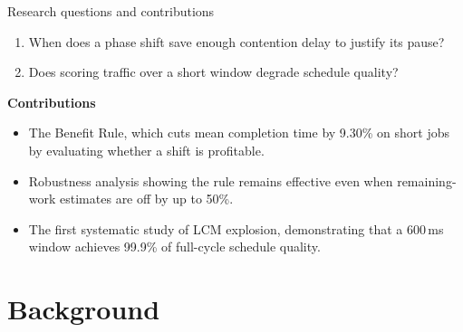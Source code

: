 \documentclass[aspectratio=169,11pt,c]{beamer}
\begin{document}
\begin{frame}{Research questions and contributions}
  \begin{enumerate}[<+->]
    \item When does a phase shift save enough contention delay to justify its pause?
    \item Does scoring traffic over a short window degrade schedule quality?
  \end{enumerate}
  \vspace{0.8em}
  \textbf{Contributions}
  \begin{itemize}[<+->]
    \item The \alert{Benefit Rule}, which cuts mean completion time by 9.30\% on short jobs by evaluating whether a shift is profitable.
    \item Robustness analysis showing the rule remains effective even when remaining-work estimates are off by up to 50\%.
    \item The first systematic study of LCM explosion, demonstrating that a 600\,ms window achieves 99.9\% of full-cycle schedule quality.
  \end{itemize}
\end{frame}

\section{Background}
\end{document}

